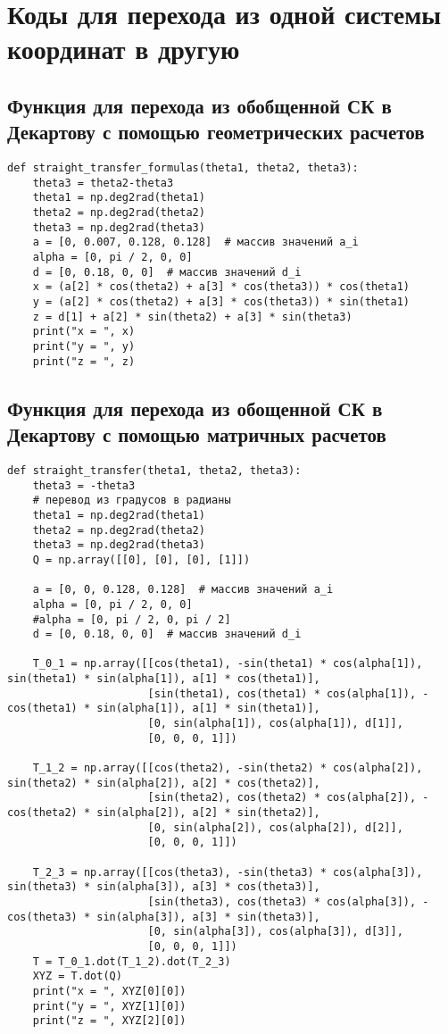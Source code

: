 \documentclass{article}
\begin{document}
\section{Коды для перехода из одной системы координат в другую}
\subsection{Функция для перехода из обобщенной СК в Декартову с помощью геометрических расчетов}
\begin{verbatim}
def straight_transfer_formulas(theta1, theta2, theta3):
    theta3 = theta2-theta3
    theta1 = np.deg2rad(theta1)
    theta2 = np.deg2rad(theta2)
    theta3 = np.deg2rad(theta3)
    a = [0, 0.007, 0.128, 0.128]  # массив значений a_i
    alpha = [0, pi / 2, 0, 0]
    d = [0, 0.18, 0, 0]  # массив значений d_i
    x = (a[2] * cos(theta2) + a[3] * cos(theta3)) * cos(theta1)
    y = (a[2] * cos(theta2) + a[3] * cos(theta3)) * sin(theta1)
    z = d[1] + a[2] * sin(theta2) + a[3] * sin(theta3)
    print("x = ", x)
    print("y = ", y)
    print("z = ", z)

\end{verbatim}

\subsection{Функция для перехода из обощенной СК в Декартову с помощью матричных расчетов}
\begin{verbatim}
def straight_transfer(theta1, theta2, theta3):
    theta3 = -theta3
    # перевод из градусов в радианы
    theta1 = np.deg2rad(theta1)
    theta2 = np.deg2rad(theta2)
    theta3 = np.deg2rad(theta3)
    Q = np.array([[0], [0], [0], [1]])

    a = [0, 0, 0.128, 0.128]  # массив значений a_i
    alpha = [0, pi / 2, 0, 0]
    #alpha = [0, pi / 2, 0, pi / 2]
    d = [0, 0.18, 0, 0]  # массив значений d_i

    T_0_1 = np.array([[cos(theta1), -sin(theta1) * cos(alpha[1]), sin(theta1) * sin(alpha[1]), a[1] * cos(theta1)],
                      [sin(theta1), cos(theta1) * cos(alpha[1]), -cos(theta1) * sin(alpha[1]), a[1] * sin(theta1)],
                      [0, sin(alpha[1]), cos(alpha[1]), d[1]],
                      [0, 0, 0, 1]])

    T_1_2 = np.array([[cos(theta2), -sin(theta2) * cos(alpha[2]), sin(theta2) * sin(alpha[2]), a[2] * cos(theta2)],
                      [sin(theta2), cos(theta2) * cos(alpha[2]), -cos(theta2) * sin(alpha[2]), a[2] * sin(theta2)],
                      [0, sin(alpha[2]), cos(alpha[2]), d[2]],
                      [0, 0, 0, 1]])

    T_2_3 = np.array([[cos(theta3), -sin(theta3) * cos(alpha[3]), sin(theta3) * sin(alpha[3]), a[3] * cos(theta3)],
                      [sin(theta3), cos(theta3) * cos(alpha[3]), -cos(theta3) * sin(alpha[3]), a[3] * sin(theta3)],
                      [0, sin(alpha[3]), cos(alpha[3]), d[3]],
                      [0, 0, 0, 1]])
    T = T_0_1.dot(T_1_2).dot(T_2_3)
    XYZ = T.dot(Q)
    print("x = ", XYZ[0][0])
    print("y = ", XYZ[1][0])
    print("z = ", XYZ[2][0])
\end{verbatim}
\end{document}
